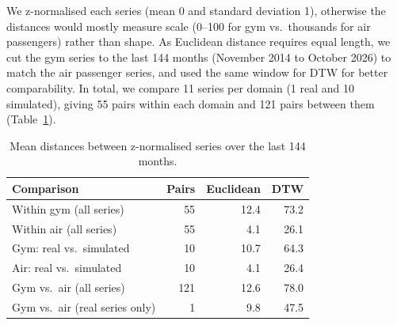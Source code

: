 \documentclass[11pt,a4paper]{article}
\begin{document}
We z-normalised each series (mean 0 and standard deviation 1), otherwise the distances would mostly measure scale (0--100 for gym vs.\ thousands for air passengers) rather than shape. As Euclidean distance requires equal length, we cut the gym series to the last 144 months (November 2014 to October 2026) to match the air passenger series, and used the same window for DTW for better comparability. In total, we compare 11 series per domain (1 real and 10 simulated), giving 55 pairs within each domain and 121 pairs between them (Table~\ref{tab:distances}).

%
%

\begin{table}[!htb]
\centering
\small
\begin{tabular}{lrrr}
\toprule
Comparison & Pairs & Euclidean & DTW \\
\midrule
Within gym (all series) & 55 & 12.4 & 73.2 \\
Within air (all series) & 55 & 4.1 & 26.1 \\
Gym: real vs.\ simulated & 10 & 10.7 & 64.3 \\
Air: real vs.\ simulated & 10 & 4.1 & 26.4 \\
Gym vs.\ air (all series) & 121 & 12.6 & 78.0 \\
Gym vs.\ air (real series only) & 1 & 9.8 & 47.5 \\
\bottomrule
\end{tabular}
\caption{Mean distances between z-normalised series over the last 144 months.}
\label{tab:distances}
\end{table}
\end{document}
